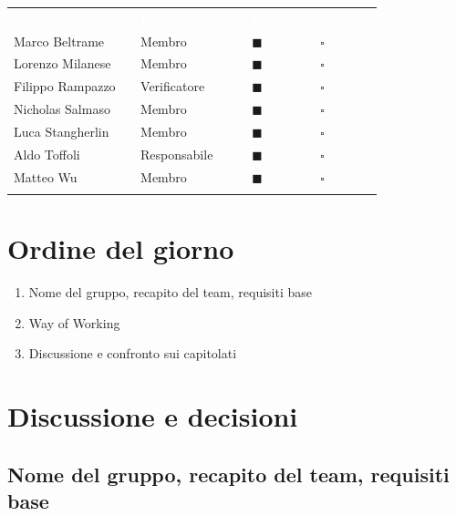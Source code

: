 \documentclass[12pt,a4paper]{article}
\newcommand{\tightlist}{\setlength{\itemsep}{1pt}\setlength{\parskip}{0pt}}
\begin{document}
\begin{center}
\begin{tabularx}{\linewidth}{>{\raggedright\arraybackslash}X>{\centering\arraybackslash}X>{\centering\arraybackslash}p{2.2cm}>{\centering\arraybackslash}p{2.2cm}}
\rowcolor{bfblue}\textcolor{white}{\textbf{Nome e Cognome}} & \textcolor{white}{\textbf{Ruolo Progetto}} & \textcolor{white}{\textbf{Presente}} & \textcolor{white}{\textbf{Assente}} \\
Marco Beltrame & Membro & $\blacksquare$ & $\square$ \\ \arrayrulecolor{bfline}\hline
Lorenzo Milanese & Membro & $\blacksquare$ & $\square$ \\ \arrayrulecolor{bfline}\hline
Filippo Rampazzo & Verificatore & $\blacksquare$ & $\square$ \\ \arrayrulecolor{bfline}\hline
Nicholas Salmaso & Membro & $\blacksquare$ & $\square$ \\ \arrayrulecolor{bfline}\hline
Luca Stangherlin & Membro & $\blacksquare$ & $\square$ \\ \arrayrulecolor{bfline}\hline
Aldo Toffoli & Responsabile & $\blacksquare$ & $\square$ \\ \arrayrulecolor{bfline}\hline
Matteo Wu & Membro & $\blacksquare$ & $\square$ \\ \arrayrulecolor{bfline}\hline
\end{tabularx}
\end{center}


\hypertarget{ordine-del-giorno}{%
\section{Ordine del giorno}}

\begin{enumerate}
\tightlist
\item Nome del gruppo, recapito del team, requisiti base 
\item Way of Working
\item Discussione e confronto sui capitolati
\end{enumerate}

\hypertarget{discussione-e-decisioni}{%
\section{Discussione e decisioni}}

\hypertarget{argomento-1}{%
\subsection{Nome del gruppo, recapito del team, requisiti base }}
\end{document}
